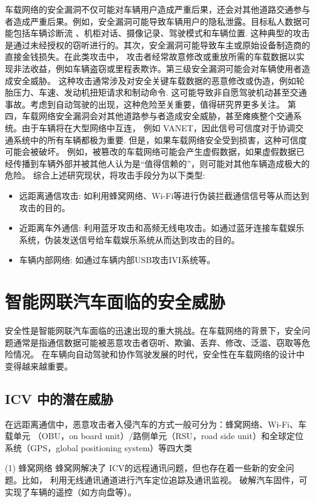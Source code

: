 车载网络的安全漏洞不仅可能对车辆用户造成严重后果，还会对其他道路交通参与者造成严重后果。例如，安全漏洞可能导致车辆用户的隐私泄露。目标私人数据可能包括车辆诊断流
、机柜对话、摄像记录、驾驶模式和车辆位置\cite{amoozadeh2015security}. 
这种典型的攻击是通过未经授权的窃听进行的。其次，安全漏洞可能导致车主或原始设备制造商的直接金钱损失。在此类攻击中，
攻击者经常故意修改或重放所需的车载数据以实现非法收益，例如车辆盗窃或里程表欺诈。第三级安全漏洞可能会对车辆使用者造成安全威胁。
这种攻击通常涉及对安全关键车载数据的恶意修改或伪造，例如轮胎压力、车速、发动机扭矩请求和制动命令. 
这可能导致非自愿驾驶机动甚至交通事故。考虑到自动驾驶的出现，这种危险至关重要，值得研究界更多关注。
第四，车载网络安全漏洞会对其他道路参与者造成安全威胁，甚至瘫痪整个交通系统。由于车辆将在大型网络中互连，
例如 VANET，因此信号可信度对于协调交通系统中的所有车辆都极为重要\cite{harding2014vehicle}.
 但是，如果车载网络安全受到损害，这种可信度可能会被破坏。
 例如，被篡改的车载网络可能会产生虚假数据，如果虚假数据已经传播到车辆外部并被其他人认为是“值得信赖的”，则可能对其他车辆造成极大的危险。
综合上述研究现状，将攻击手段分为以下类型:
\begin{itemize}
    \item 远距离通信攻击: 如利用蜂窝网络、Wi-Fi等进行伪装拦截通信信号等从而达到攻击的目的。
    \item 近距离车外通信: 利用蓝牙攻击和高频无线电攻击。如通过蓝牙连接车载娱乐系统，伪装发送信号给车载娱乐系统从而达到攻击的目的。
    \item 车辆内部网络: 如通过车辆内部USB攻击IVI系统等。
\end{itemize}

\section{智能网联汽车面临的安全威胁}
安全性是智能网联汽车面临的迅速出现的重大挑战。在车载网络的背景下，安全问题通常是指通信数据可能被恶意攻击者窃听、欺骗、丢弃、修改、泛滥、窃取等危险情况。
在车辆向自动驾驶和协作驾驶发展的时代，安全性在车载网络的设计中变得越来越重要。

\subsection{ICV 中的潜在威胁}
在远距离通信中，恶意攻击者入侵汽车的方式一般可分为：蜂窝网络、Wi-Fi、车载单元
（OBU，on board unit）/路侧单元（RSU，road side
unit）和全球定位系统（GPS，global positioning
system）等四大类

(1) 蜂窝网络
蜂窝网解决了 ICV的远程通讯问题，但也存在着一些新的安全问题。比如，
利用无线通讯通道进行汽车定位追踪及通讯监视。
破解汽车固件，可实现了车辆的遥控（如方向盘等）。


